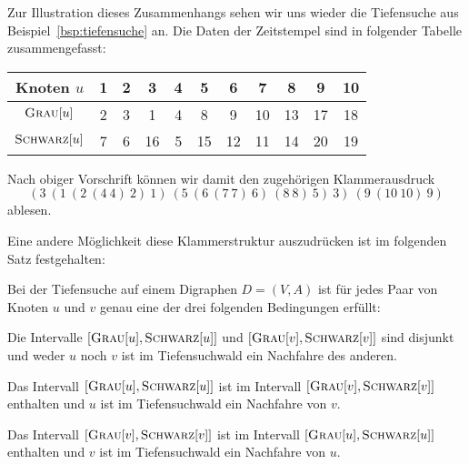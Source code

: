 \begin{bsp} 
Zur Illustration dieses Zusammenhangs sehen wir uns wieder die Tiefensuche aus Beispiel~\ref{bsp:tiefensuche} an.
Die Daten der Zeitstempel sind in folgender Tabelle zusammengefasst:
\begin{table}[H]
\centering
\begin{tabular}{|c|c|c|c|c|c|c|c|c|c|c|}
\hline
\textbf{Knoten $u$}        & \textbf{1} & \textbf{2} & \textbf{3} & \textbf{4} & \textbf{5} & \textbf{6} & \textbf{7} & \textbf{8} & \textbf{9} & \textbf{10} \\ \hline
\textbf{$\mathop{\text{\textsc{Grau}}}[u]$}    & 2          & 3          & 1          & 4          & 8          & 9          & 10         & 13         & 17         & 18          \\ \hline
\textbf{$\mathop{\text{\textsc{Schwarz}}}[u]$} & 7          & 6          & 16         & 5          & 15         & 12         & 11         & 14         & 20         & 19          \\ \hline
\end{tabular}
\end{table}
Nach obiger Vorschrift können wir damit den zugehörigen Klammerausdruck
\[
(3\ (1\ (2\ (4\ 4)\ 2)\ 1)\ (5\ (6\ (7\ 7)\ 6)\ (8\ 8)\ 5)\ 3)\ (9\ (10\ 10)\ 9)
\]
ablesen.

Eine andere Möglichkeit diese Klammerstruktur auszudrücken ist im folgenden Satz festgehalten:
\end{bsp} 

\begin{thm}[Klammerungstheorem]
\label{thm:klammerung}
Bei der Tiefensuche auf einem Digraphen $D=(V,A)$ ist für jedes Paar von Knoten $u$ und $v$ genau eine der drei folgenden Bedingungen erfüllt:
\begin{enuma}

 \item Die Intervalle $\left[\mathop{\text{\textsc{Grau}}}[u],\mathop{\text{\textsc{Schwarz}}}[u]\right]$ und $[\mathop{\text{\textsc{Grau}}}[v],\mathop{\text{\textsc{Schwarz}}}[v]]$ sind disjunkt und weder $u$ noch $v$ ist im Tiefensuchwald ein Nachfahre des anderen.

 \item Das Intervall $\left[\mathop{\text{\textsc{Grau}}}[u],\mathop{\text{\textsc{Schwarz}}}[u]\right]$ ist im Intervall $[\mathop{\text{\textsc{Grau}}}[v],\mathop{\text{\textsc{Schwarz}}}[v]]$ enthalten und $u$ ist im Tiefensuchwald ein Nachfahre von $v$.

 \item Das Intervall $\left[\mathop{\text{\textsc{Grau}}}[v],\mathop{\text{\textsc{Schwarz}}}[v]\right]$ ist im Intervall $[\mathop{\text{\textsc{Grau}}}[u],\mathop{\text{\textsc{Schwarz}}}[u]]$ enthalten und $v$ ist im Tiefensuchwald ein Nachfahre von $u$.

\end{enuma}
\end{thm}

